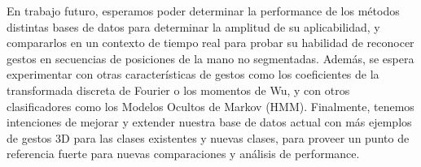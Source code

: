 En trabajo futuro, esperamos poder determinar la performance de los métodos distintas bases de datos para determinar la amplitud de su aplicabilidad, y compararlos en un contexto de tiempo real para probar su habilidad de reconocer gestos en secuencias de posiciones de la mano no segmentadas. Además, se espera experimentar con otras características de gestos como los coeficientes de la transformada discreta de Fourier o los momentos de Wu, y con otros clasificadores como los Modelos Ocultos de Markov (HMM). Finalmente, tenemos intenciones de mejorar y extender nuestra base de datos actual con más ejemplos de gestos 3D para las clases existentes y nuevas clases, para proveer un punto de referencia fuerte para nuevas comparaciones y análisis de performance.